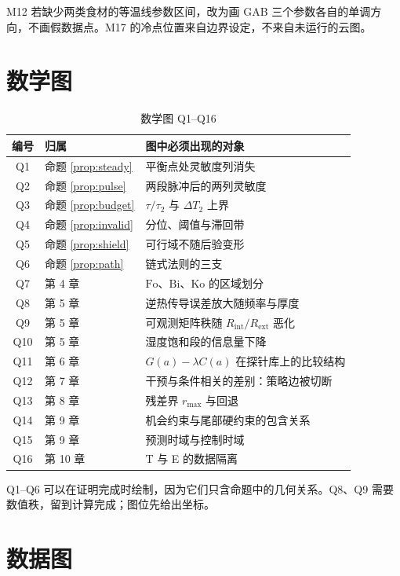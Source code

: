 M12 若缺少两类食材的等温线参数区间，改为画 GAB 三个参数各自的单调方向，不画假数据点。M17 的冷点位置来自边界设定，不来自未运行的云图。

\section{数学图}

\begin{table}[H]
\centering
\caption{数学图 Q1--Q16}
\begin{tabularx}{\textwidth}{clX}
\toprule
编号 & 归属 & 图中必须出现的对象 \\
\midrule
Q1 & 命题 \ref{prop:steady} & 平衡点处灵敏度列消失 \\
Q2 & 命题 \ref{prop:pulse} & 两段脉冲后的两列灵敏度 \\
Q3 & 命题 \ref{prop:budget} & $\tau/\tau_2$ 与 $\Delta T_2$ 上界 \\
Q4 & 命题 \ref{prop:invalid} & 分位、阈值与滞回带 \\
Q5 & 命题 \ref{prop:shield} & 可行域不随后验变形 \\
Q6 & 命题 \ref{prop:path} & 链式法则的三支 \\
Q7 & 第 4 章 & $\mathrm{Fo}$、$\mathrm{Bi}$、$\mathrm{Ko}$ 的区域划分 \\
Q8 & 第 5 章 & 逆热传导误差放大随频率与厚度 \\
Q9 & 第 5 章 & 可观测矩阵秩随 $R_{\mathrm{int}}/R_{\mathrm{ext}}$ 恶化 \\
Q10 & 第 5 章 & 湿度饱和段的信息量下降 \\
Q11 & 第 6 章 & $G(a)-\lambda C(a)$ 在探针库上的比较结构 \\
Q12 & 第 7 章 & 干预与条件相关的差别：策略边被切断 \\
Q13 & 第 8 章 & 残差界 $r_{\max}$ 与回退 \\
Q14 & 第 9 章 & 机会约束与尾部硬约束的包含关系 \\
Q15 & 第 9 章 & 预测时域与控制时域 \\
Q16 & 第 10 章 & T 与 E 的数据隔离 \\
\bottomrule
\end{tabularx}
\end{table}

Q1--Q6 可以在证明完成时绘制，因为它们只含命题中的几何关系。Q8、Q9 需要数值秩，留到计算完成；图位先给出坐标。

\section{数据图}

